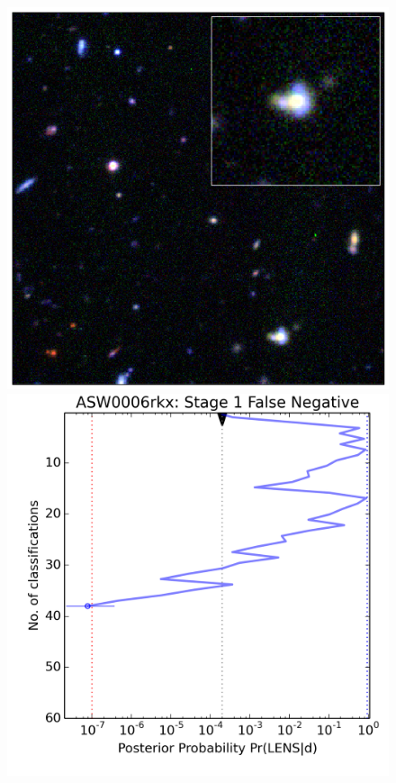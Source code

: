 \documentclass[useAMS,usenatbib,a4paper]{mn2e}
\begin{document}
\begin{figure}
\begin{minipage}{\linewidth}
\begin{minipage}[t]{0.47\linewidth}
\begin{minipage}{0.50\linewidth}
    \end{minipage}
  \end{minipage}\hfill
  \begin{minipage}[t]{0.47\linewidth}
    \begin{minipage}{0.46\linewidth}
      \centering\includegraphics[width=\linewidth]{sw-system-figs/ASW0006rkx_gri.png}
    \end{minipage}\hfill
    \begin{minipage}{0.50\linewidth}
      \centering\includegraphics[width=\linewidth]{sw-system-figs/ASW0006rkx_stage1_trajectory.png}
    \end{minipage}
  \end{minipage}
\end{minipage}


\end{figure}
\end{document}
